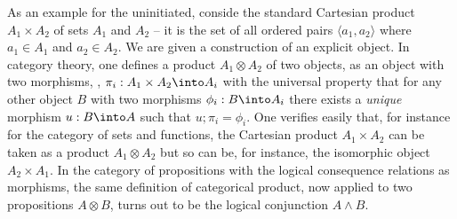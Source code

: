 As an example for the uninitiated, conside the standard Cartesian product
$A_1\times A_2$ of sets $A_1$ and $A_2$ -- it is the set of all ordered pairs
$\langle a_1,a_2\rangle$ where $a_1\in A_1$ and $a_2\in A_2$. We are given a
construction of an explicit object. In category theory, one defines a product
$A_1\otimes A_2$ of two objects, as an object with two morphisms,
, $\pi_i:A_1\times A_2\into A_i$ with the universal property
that for any other object $B$ with two morphisms $\phi_i:B\into A_i$ there
exists a {\em unique} morphism $u:B\into A$ such that $u;\pi_i=\phi_i$. One
verifies easily that, for instance for the category of sets and functions, the
Cartesian product $A_1\times A_2$ can be taken as a product $A_1\otimes A_2$ but
so can be, for instance, the isomorphic object $A_2\times A_1$. In the category
of propositions with the logical consequence relations as morphisms, the same
definition of categorical product, now applied to two propositions $A\otimes B$,
turns out to be the logical conjunction $A\land B$.


